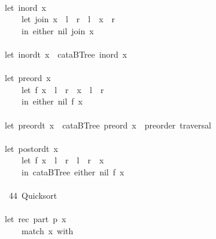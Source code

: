 \documentclass[a4paper]{article}
\begin{document}
\begin{tabbing}
\ttfamily ~\\
\ttfamily ~let~inord~x~\\
\ttfamily ~~~~~let~join~x~~l~~r~~l~~x~~r\\
\ttfamily ~~~~~in~either~nil~join~x\\
\ttfamily ~\\
\ttfamily ~let~inordt~x~~cataBTree~inord~x\\
\ttfamily ~\\
\ttfamily ~let~preord~x~~\\
\ttfamily ~~~~~let~f~x~~l~~r~~x~~l~~r\\
\ttfamily ~~~~~in~either~nil~f~x\\
\ttfamily ~\\
\ttfamily ~let~preordt~x~~cataBTree~preord~x~~preorder~traversal\\
\ttfamily ~~~~~\\
\ttfamily ~let~postordt~x~\\
\ttfamily ~~~~~let~f~x~~l~~r~~l~~r~~x\\
\ttfamily ~~~~~in~cataBTree~either~nil~f~x\\
\ttfamily ~\\
\ttfamily ~~44~Quicksort~\\
\ttfamily ~\\
\ttfamily ~let~rec~part~p~x~\\
\ttfamily ~~~~~match~x~with\\
\ttfamily ~~~~~~~~\\

\end{tabbing}
\end{document}
